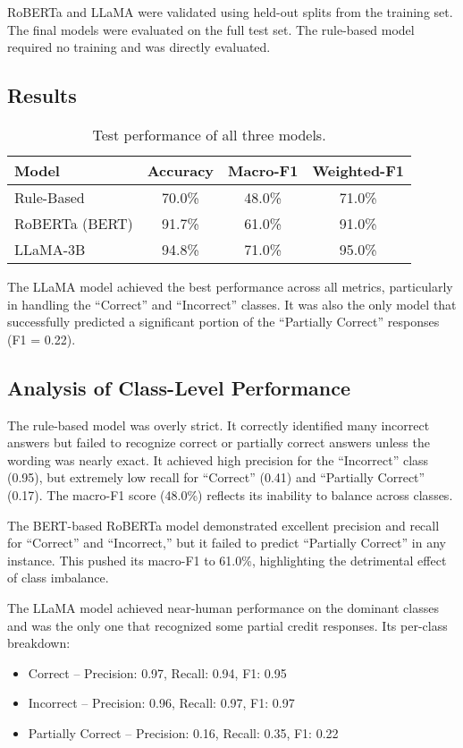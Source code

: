 \documentclass[11pt]{article}
\begin{document}
RoBERTa and LLaMA were validated using held-out splits from the training set. The final models were evaluated on the full test set. The rule-based model required no training and was directly evaluated.

\subsection{Results}
\begin{table}[h]
\centering
\begin{tabular}{lccc}
\hline
\textbf{Model} & \textbf{Accuracy} & \textbf{Macro-F1} & \textbf{Weighted-F1} \\
\hline
Rule-Based & 70.0\% & 48.0\% & 71.0\% \\
RoBERTa (BERT) & 91.7\% & 61.0\% & 91.0\% \\
LLaMA-3B & 94.8\% & 71.0\% & 95.0\% \\
\hline
\end{tabular}
\caption{Test performance of all three models.}
\end{table}

The LLaMA model achieved the best performance across all metrics, particularly in handling the “Correct” and “Incorrect” classes. It was also the only model that successfully predicted a significant portion of the “Partially Correct” responses (F1 = 0.22).

\subsection{Analysis of Class-Level Performance}
The rule-based model was overly strict. It correctly identified many incorrect answers but failed to recognize correct or partially correct answers unless the wording was nearly exact. It achieved high precision for the “Incorrect” class (0.95), but extremely low recall for “Correct” (0.41) and “Partially Correct” (0.17). The macro-F1 score (48.0\%) reflects its inability to balance across classes.

The BERT-based RoBERTa model demonstrated excellent precision and recall for “Correct” and “Incorrect,” but it failed to predict “Partially Correct” in any instance. This pushed its macro-F1 to 61.0\%, highlighting the detrimental effect of class imbalance.

The LLaMA model achieved near-human performance on the dominant classes and was the only one that recognized some partial credit responses. Its per-class breakdown:
\begin{itemize}
    \item Correct – Precision: 0.97, Recall: 0.94, F1: 0.95
    \item Incorrect – Precision: 0.96, Recall: 0.97, F1: 0.97
    \item Partially Correct – Precision: 0.16, Recall: 0.35, F1: 0.22
\end{itemize}
\end{document}
